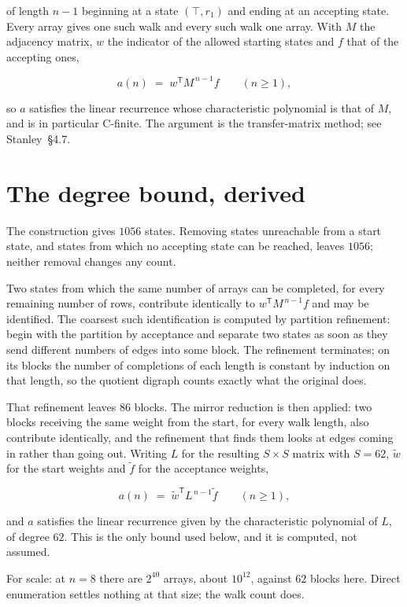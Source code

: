 \documentclass[11pt]{article}
\theoremstyle{definition}
\begin{document}
of length $n-1$ beginning at a state $(\top,r_1)$ and ending at an accepting state. Every array gives one such walk and every such walk one array. With $M$ the adjacency matrix, $w$ the indicator of the allowed starting states and $f$ that of the accepting ones,

\[a(n) \;=\; w^{\mathsf T} M^{\,n-1} f \qquad (n \ge 1),\]

so $a$ satisfies the linear recurrence whose characteristic polynomial is that of $M$, and is in particular C-finite. The argument is the transfer-matrix method; see Stanley~\S4.7.

\section{The degree bound, derived}

The construction gives $1056$ states. Removing states unreachable from a start state, and states from which no accepting state can be reached, leaves $1056$; neither removal changes any count.

Two states from which the same number of arrays can be completed, for every remaining number of rows, contribute identically to $w^{\mathsf T}M^{\,n-1}f$ and may be identified. The coarsest such identification is computed by partition refinement: begin with the partition by acceptance and separate two states as soon as they send different numbers of edges into some block. The refinement terminates; on its blocks the number of completions of each length is constant by induction on that length, so the quotient digraph counts exactly what the original does.

That refinement leaves $86$ blocks. The mirror reduction is then applied: two blocks receiving the same weight from the start, for every walk length, also contribute identically, and the refinement that finds them looks at edges coming in rather than going out. Writing $L$ for the resulting $S \times S$ matrix with $S = 62$, $\tilde w$ for the start weights and $\tilde f$ for the acceptance weights,

\[a(n) \;=\; \tilde w^{\mathsf T} L^{\,n-1} \tilde f \qquad (n \ge 1),\]

and $a$ satisfies the linear recurrence given by the characteristic polynomial of $L$, of degree $62$. This is the only bound used below, and it is computed, not assumed.

For scale: at $n = 8$ there are $2^{40}$ arrays, about $10^{12}$, against $62$ blocks here. Direct enumeration settles nothing at that size; the walk count does.
\end{document}
